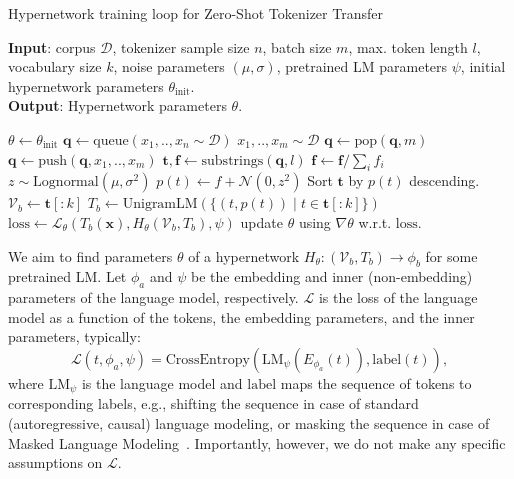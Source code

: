 \documentclass{article}
\begin{document}
\begin{algorithm}[t]
\renewcommand{\algorithmiccomment}[1]{$\triangleright${\color{NavyBlue} #1}}

\caption{Hypernetwork training loop for Zero-Shot Tokenizer Transfer}\label{alg:training}
\hspace*{\algorithmicindent} \textbf{Input}: corpus $\mathcal{D}$, tokenizer sample size $n$, batch size $m$, max. token length $l$, vocabulary size $k$, noise parameters $(\mu, \sigma)$, pretrained LM parameters $\psi$, initial hypernetwork parameters $\theta_{\text{init}}$. \\
\hspace*{\algorithmicindent} \textbf{Output}: Hypernetwork parameters $\theta$.
\begin{algorithmic}[1]
\State $\theta \gets \theta_{\text{init}}$
\State $\bm{q} \gets \text{queue}(x_1, .., x_n \sim \mathcal{D})$ 
\State
{}
    \State $x_1, .., x_m \sim \mathcal{D}$
    \State $\bm{q} \gets \text{pop}(\bm{q}, m)$ 
    \State $\bm{q} \gets \text{push}(\bm{q}, x_1, .., x_m)$ 
    \State
    \State $\bm{t}, \bm{f} \gets \text{substrings}(\bm{q}, l)$ 
    \State $\bm{f} \gets \bm{f} / \sum_i f_i$ 
    \State $z \sim \text{Lognormal}(\mu, \sigma^2)$
        \State $p(t) \gets f + \mathcal{N}(0, z^2)$ 
    \EndFor
    \State Sort $\bm{t}$ by $p(t)$ descending.
    \State $\mathcal{V}_b \gets \bm{t}[:k]$ 
    \State $T_b \gets \text{UnigramLM}(\{(t, p(t))\;|\; t \in \bm{t}[:k]\})$ 
    \State
    \State $\mathrm{loss} \gets \mathcal{L}_{\theta}(T_b(\bm{x}), H_{\theta}(\mathcal{V}_b, T_b), \psi)$ 
    \State
    \State update $\theta$ using $\nabla \theta$ w.r.t. $\mathrm{loss}$.
\EndFor
\EndProcedure
\end{algorithmic}
\end{algorithm}

We aim to find parameters \(\theta\) of a hypernetwork \(H_{\theta}: (\mathcal{V}_b, T_b) \rightarrow \phi_b\) for some pretrained LM. Let \(\phi_a\) and \(\psi\) be the embedding and inner (non-embedding) parameters of the language model, respectively. \(\mathcal{L}\) is the loss of the language model as a function of the tokens, the embedding parameters, and the inner parameters, typically:
\[
\mathcal{L}(t, \phi_a, \psi) = \text{CrossEntropy}(\mathrm{LM}_{\psi}(E_{\phi_a}(t)), \mathrm{label}(t)),
\]
where $\mathrm{LM}_{\psi}$ is the language model and $\mathrm{label}$ maps the sequence of tokens to corresponding labels, e.g., shifting the sequence in case of standard (autoregressive, causal) language modeling, or masking the sequence in case of Masked Language Modeling~\citep{devlin-etal-2019-bert}. Importantly, however, we do not make any specific assumptions on $\mathcal{L}$.
\end{document}
